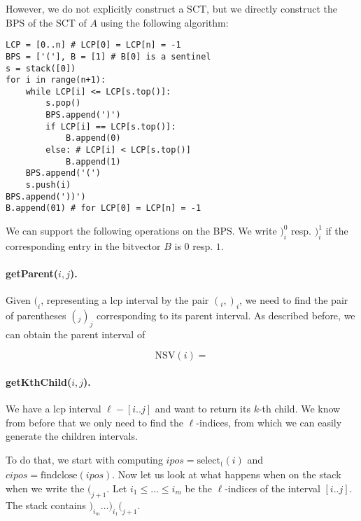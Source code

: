 However, we do not explicitly construct a SCT, but we directly construct the BPS of the SCT of $A$ using the following algorithm:
\begin{verbatim}
LCP = [0..n] # LCP[0] = LCP[n] = -1
BPS = ['('], B = [1] # B[0] is a sentinel
s = stack([0])
for i in range(n+1):
    while LCP[i] <= LCP[s.top()]:
        s.pop()
        BPS.append(')')
        if LCP[i] == LCP[s.top()]:
            B.append(0)
        else: # LCP[i] < LCP[s.top()]
            B.append(1)
    BPS.append('(')
    s.push(i)
BPS.append('))')
B.append(01) # for LCP[0] = LCP[n] = -1
\end{verbatim}

We can support the following operations on the BPS.
We write $)_i^0$ resp. $)_i^1$ if the corresponding entry in the bitvector $B$ is $0$ resp. $1$.

\paragraph{getParent($i, j$).}
Given $(_i$, representing a lcp interval by the pair $(_i, )_i$, we need to find the pair of parentheses $(_j )_j$ corresponding to its parent interval.
As described before, we can obtain the parent interval of

$$\text{NSV}(i) = $$

\paragraph{getKthChild($i,j$).}
We have a lcp interval $\ell-[i..j]$ and want to return its $k$-th child.
We know from before that we only need to find the $\ell$-indices, from which we can easily generate the children intervals.

To do that, we start with computing $ipos = \text{select}_( (i)$ and $cipos = \text{findclose}(ipos)$.
Now let us look at what happens when on the stack when we write the $(_{j+1}$. Let $i_1 \leq \ldots \leq i_m$ be the $\ell$-indices of the interval $[i..j]$.
The stack contains $)_{i_m} \ldots )_{i_1} (_{j+1}$.
